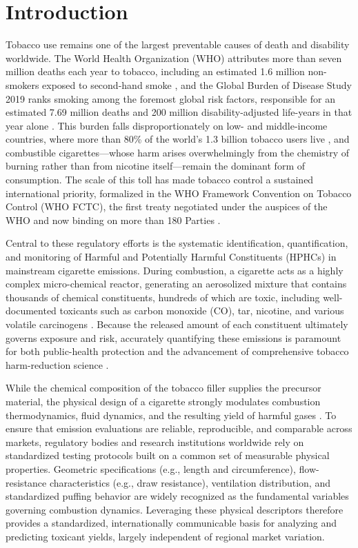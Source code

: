 \documentclass[11pt]{article}
\begin{document}
\section*{Introduction}

Tobacco use remains one of the largest preventable causes of death and disability worldwide. The World Health Organization (WHO) attributes more than seven million deaths each year to tobacco, including an estimated 1.6 million non-smokers exposed to second-hand smoke \cite{who2025tobacco}, and the Global Burden of Disease Study 2019 ranks smoking among the foremost global risk factors, responsible for an estimated 7.69 million deaths and 200 million disability-adjusted life-years in that year alone \cite{gbd2019tobacco}. This burden falls disproportionately on low- and middle-income countries, where more than 80\% of the world's 1.3 billion tobacco users live \cite{who2025tobacco}, and combustible cigarettes---whose harm arises overwhelmingly from the chemistry of burning rather than from nicotine itself---remain the dominant form of consumption. The scale of this toll has made tobacco control a sustained international priority, formalized in the WHO Framework Convention on Tobacco Control (WHO FCTC), the first treaty negotiated under the auspices of the WHO and now binding on more than 180 Parties \cite{who2003fctc}.

Central to these regulatory efforts is the systematic identification, quantification, and monitoring of Harmful and Potentially Harmful Constituents (HPHCs) in mainstream cigarette emissions. During combustion, a cigarette acts as a highly complex micro-chemical reactor, generating an aerosolized mixture that contains thousands of chemical constituents, hundreds of which are toxic, including well-documented toxicants such as carbon monoxide (CO), tar, nicotine, and various volatile carcinogens \cite{BAKER2006373, ijerph8020613, Hecht2003TobaccoCarcinogens}. Because the released amount of each constituent ultimately governs exposure and risk, accurately quantifying these emissions is paramount for both public-health protection and the advancement of comprehensive tobacco harm-reduction science \cite{Burns2008WHO, HAMMOND2006781, MURPHY2017342}.

While the chemical composition of the tobacco filler supplies the precursor material, the physical design of a cigarette strongly modulates combustion thermodynamics, fluid dynamics, and the resulting yield of harmful gases \cite{BAKER2006373, OConnor2008CigaretteDesign, PMID27222918}. To ensure that emission evaluations are reliable, reproducible, and comparable across markets, regulatory bodies and research institutions worldwide rely on standardized testing protocols built on a common set of measurable physical properties. Geometric specifications (e.g., length and circumference), flow-resistance characteristics (e.g., draw resistance), ventilation distribution, and standardized puffing behavior are widely recognized as the fundamental variables governing combustion dynamics. Leveraging these physical descriptors therefore provides a standardized, internationally communicable basis for analyzing and predicting toxicant yields, largely independent of regional market variation.
\end{document}
